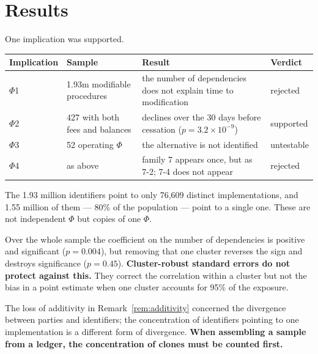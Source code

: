 \section{Results}
\label{sec:protocol-results}

One implication was supported.

\begin{center}
\begin{tabularx}{\textwidth}{@{}llXl@{}}
\toprule
Implication & Sample & Result & Verdict \\
\midrule
$\Phi$1 & 1.93m modifiable procedures & the number of dependencies does not explain time to modification & rejected \\
$\Phi$2 & 427 with both fees and balances & declines over the 30 days before cessation ($p=3.2\times10^{-9}$) & supported \\
$\Phi$3 & 52 operating $\Phi$ & the alternative is not identified & untestable \\
$\Phi$4 & as above & family 7 appears once, but as 7-2; 7-4 does not appear & rejected \\
\bottomrule
\end{tabularx}
\label{tab:protocol-results}
\end{center}

\begin{remark}
\label{rem:clone-concentration}
The 1.93 million identifiers point to only 76{,}609 distinct implementations, and 1.55
million of them --- 80\% of the population --- point to a single one. These are not
independent $\Phi$ but copies of one $\Phi$.

Over the whole sample the coefficient on the number of dependencies is positive and
significant ($p=0.004$), but removing that one cluster reverses the sign and destroys
significance ($p=0.45$).
\textbf{Cluster-robust standard errors do not protect against this.} They correct the
correlation within a cluster but not the bias in a point estimate when one cluster accounts
for 95\% of the exposure.

The loss of additivity in Remark~\ref{rem:additivity} concerned the divergence between
parties and identifiers; the concentration of identifiers pointing to one implementation is a
different form of divergence.
\textbf{When assembling a sample from a ledger, the concentration of clones must be counted
first.}
\end{remark}

